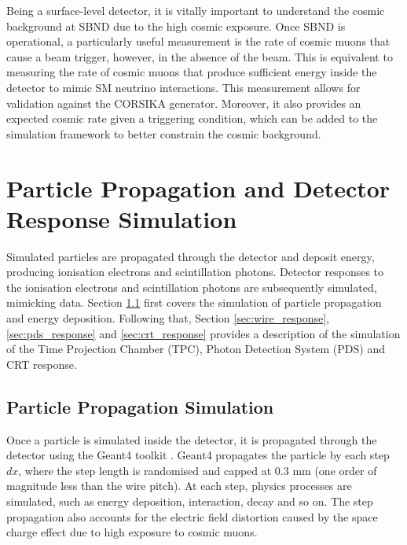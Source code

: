 Being a surface-level detector, it is vitally important to understand the cosmic background at SBND due to the high cosmic exposure.
Once SBND is operational, a particularly useful measurement is the rate of cosmic muons that cause a beam trigger, however, in the absence of the beam.
This is equivalent to measuring the rate of cosmic muons that produce sufficient energy inside the detector to mimic SM neutrino interactions.
This measurement allows for validation against the CORSIKA generator.
Moreover, it also provides an expected cosmic rate given a triggering condition, which can be added to the simulation framework to better constrain the cosmic background.                

\section{Particle Propagation and Detector Response Simulation}
\label{sec:gen_response}

Simulated particles are propagated through the detector and deposit energy, producing ionisation electrons and scintillation photons.
Detector responses to the ionisation electrons and scintillation photons are subsequently simulated, mimicking data. 
Section \ref{sec:gen_g4} first covers the simulation of particle propagation and energy deposition.
Following that, Section \ref{sec:wire_response}, \ref{sec:pds_response} and \ref{sec:crt_response} provides a description of the simulation of the Time Projection Chamber (TPC), Photon Detection System (PDS) and CRT response. 

\subsection{Particle Propagation Simulation}
\label{sec:gen_g4}

Once a particle is simulated inside the detector, it is propagated through the detector using the Geant4 toolkit \cite{geant4}.
Geant4 propagates the particle by each step $dx$, where the step length is randomised and capped at 0.3 mm (one order of magnitude less than the wire pitch).
At each step, physics processes are simulated, such as energy deposition, interaction, decay and so on.
The step propagation also accounts for the electric field distortion caused by the space charge effect due to high exposure to cosmic muons.

